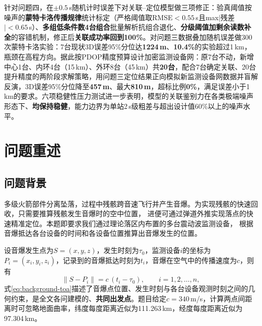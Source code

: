 \documentclass[draft,12pt,a4paper]{ctexart}
\theoremstyle{definition}
\begin{document}
针对问题四，在$\pm0.5$\,s随机计时误差下对关联--定位模型做三项修正：验真阈值按噪声的\textbf{蒙特卡洛传播规律}统计标定（严格阈值取RMSE$<0.55$\,s且max$|$残差$|<0.65$\,s）、\textbf{多组低条件数4台组合}批量解析抗组合退化、\textbf{分级阈值加剩余读数补全}的容错机制，修正后\textbf{关联成功率回到100\%}。对问题三数据叠加随机误差做300次蒙特卡洛实验：7台现状3D误差95\%分位达\textbf{1224\,m}、\textbf{10.4\%}的实验超过1\,km，瓶颈在高程方向。据此按PDOP精度预算设计加密监测设备网：原7台不动，新增中心1台、内环4台（15\,km）、外环8台（45\,km）共\textbf{20台}，配合7台确定关联、20台提升精度的两阶段求解策略，用问题三定位结果正向模拟新监测设备网数据并盲解反演，3D误差95\%分位降至\textbf{457\,m}、最大\textbf{810\,m}，超标比例\textbf{0\%}，满足误差小于1\,km的要求。六项稳健性压力测试进一步表明，模型的关联鉴别力在各类极端噪声形态下、\textbf{均保持稳健}，能力边界为单站2\,s级粗差与超出设计值60\%以上的噪声水平。

\vspace{6pt}
\newpage

\section{问题重述}
\subsection{问题背景}
多级火箭部件分离坠落，过程中残骸跨音速飞行并产生音爆。为实现残骸的快速回收，只需要推算残骸发生音爆时的空中位置，
进便可通过弹道外推实现落点的快速精准定位。本题即要求我们通过理论落区内布置的多台震动波监测设备，
根据音爆抵达各台设备的时间和各设备位置推算出音爆发生的位置。

设音爆发生点为$S=(x,y,z)$，发生时刻为$\tau_0$，监测设备$i$的坐标为$P_i=(x_i,y_i,z_i)$，记录到的音爆抵达时刻为$t_i$，音爆在空气中的传播速度为$c$，则有
\begin{equation}
  \big\|S-P_i\big\|=c\,(t_i-\tau_0),\qquad i=1,2,\dots,n,
  \label{eq:background-toa}
\end{equation}
式\eqref{eq:background-toa}描述了音爆点位置、发生时刻与各台设备观测时刻之间的几何约束，是全文各问建模的、\textbf{共同出发点}。题目给定$c=340$\,m/s，计算两点间距离时可忽略地面曲率，纬度每度距离近似为111.263\,km，经度每度距离近似为97.304\,km。
\end{document}
